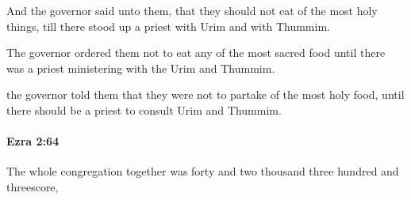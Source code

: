 			\begin{versebox}
					\item[BHS] 
					\item[LXX] 
					\item[ASV] And the governor said unto them, that they should not eat of the most holy things, till there stood up a priest with Urim and with Thummim.
					\item[NIV] The governor ordered them not to eat any of the most sacred food until there was a priest ministering with the Urim and Thummim.
					\item[NRSV] the governor told them that they were not to partake of the most holy food, until there should be a priest to consult Urim and Thummim.
			\end{versebox}

		\paragraph{Ezra 2:64} %
			\label{EZRA-2-64}

			The whole congregation together was forty and two thousand three hundred and threescore,

